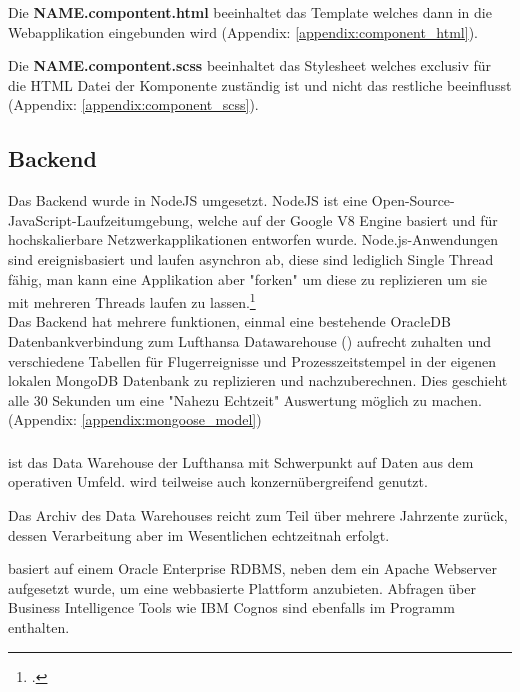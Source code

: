 	{
		\noindent
		Die \textbf{NAME.compontent.html} beeinhaltet das  Template welches dann in die Webapplikation eingebunden wird (Appendix: \ref{appendix:component_html}).
	}
	\vspace{10pt}

	{
		\noindent
		Die \textbf{NAME.compontent.scss} beeinhaltet das  Stylesheet welches exclusiv für die HTML Datei der Komponente zuständig ist und nicht das restliche  beeinflusst (Appendix: \ref{appendix:component_scss}).
	}
	

	

	\subsection{Backend}
	Das Backend wurde in NodeJS umgesetzt. NodeJS ist eine Open-Source-JavaScript-Laufzeitumgebung, welche auf der Google V8 Engine basiert und für hochskalierbare Netzwerkapplikationen entworfen wurde. Node.js-Anwendungen sind ereignisbasiert und laufen asynchron ab, diese sind lediglich Single Thread fähig, man kann eine Applikation aber "forken" um diese zu replizieren um sie mit mehreren Threads laufen zu lassen.\footcite{4}\\
	Das Backend hat mehrere funktionen, einmal eine bestehende OracleDB Datenbankverbindung zum Lufthansa Datawarehouse () aufrecht zuhalten und verschiedene Tabellen für Flugerreignisse und Prozesszeitstempel in der eigenen lokalen MongoDB Datenbank zu replizieren und nachzuberechnen. Dies geschieht alle 30 Sekunden um eine "Nahezu Echtzeit" Auswertung möglich zu machen. (Appendix: \ref{appendix:mongoose_model})



	\subsubsection{}

	{
		\noindent
		 ist das Data Warehouse der Lufthansa mit Schwerpunkt auf Daten aus dem operativen Umfeld.  wird teilweise auch konzernübergreifend genutzt.
	}

	{
		\noindent
		Das Archiv des Data Warehouses reicht zum Teil über mehrere Jahrzente zurück, dessen Verarbeitung aber im Wesentlichen echtzeitnah erfolgt.
	}

	{
		\noindent
		 basiert auf einem Oracle Enterprise RDBMS, neben dem ein Apache Webserver aufgesetzt wurde, um eine webbasierte Plattform anzubieten. Abfragen über Business Intelligence Tools wie IBM Cognos sind ebenfalls im Programm enthalten.
	}

